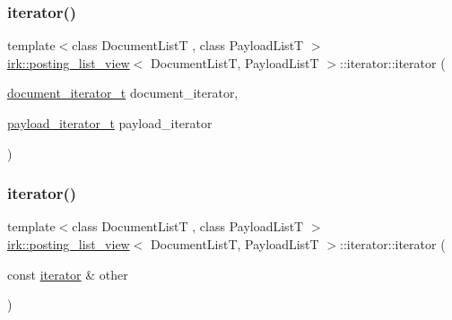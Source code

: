 \subsubsection{\texorpdfstring{iterator()}{iterator()}\hspace{0.1cm}{\footnotesize\ttfamily [1/3]}}
{\footnotesize\ttfamily template$<$class Document\+ListT , class Payload\+ListT $>$ \\
\mbox{\hyperlink{classirk_1_1posting__list__view}{irk\+::posting\+\_\+list\+\_\+view}}$<$ Document\+ListT, Payload\+ListT $>$\+::iterator\+::iterator (\begin{DoxyParamCaption}\item[{\mbox{\hyperlink{classirk_1_1posting__list__view_abaca622760e6da2c67d55cf35207250f}{document\+\_\+iterator\+\_\+t}}}]{document\+\_\+iterator,  }\item[{\mbox{\hyperlink{classirk_1_1posting__list__view_a5a153169348a164ea2cb1a18dc76e279}{payload\+\_\+iterator\+\_\+t}}}]{payload\+\_\+iterator }\end{DoxyParamCaption})\hspace{0.3cm}{\ttfamily [inline]}}

\mbox{\label{classirk_1_1posting__list__view_1_1iterator_aa4053b60f98871ed18bf6bfb87dfdd18}} 
\subsubsection{\texorpdfstring{iterator()}{iterator()}\hspace{0.1cm}{\footnotesize\ttfamily [2/3]}}
{\footnotesize\ttfamily template$<$class Document\+ListT , class Payload\+ListT $>$ \\
\mbox{\hyperlink{classirk_1_1posting__list__view}{irk\+::posting\+\_\+list\+\_\+view}}$<$ Document\+ListT, Payload\+ListT $>$\+::iterator\+::iterator (\begin{DoxyParamCaption}\item[{const \mbox{\hyperlink{classirk_1_1posting__list__view_1_1iterator}{iterator}} \&}]{other }\end{DoxyParamCaption})\hspace{0.3cm}{\ttfamily [inline]}}

\mbox{\label{classirk_1_1posting__list__view_1_1iterator_ac5ab4fb266fdc3a6a4ab8557f10e80db}} 
